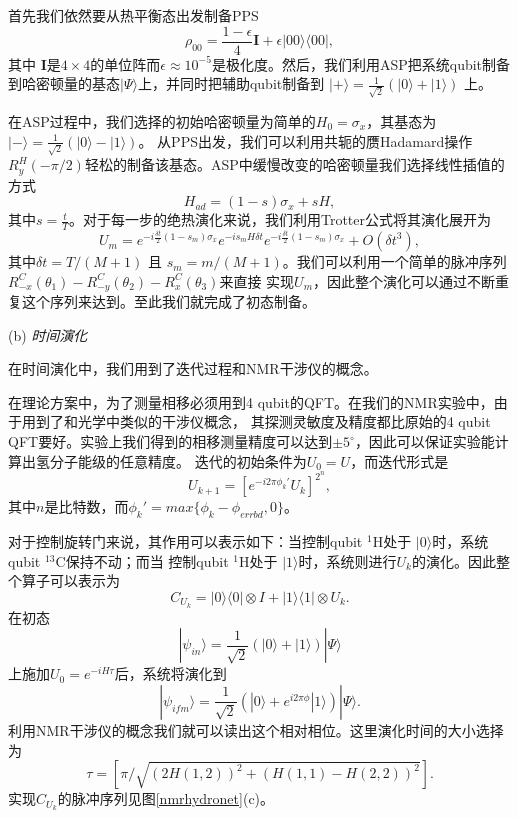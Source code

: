 首先我们依然要从热平衡态出发制备PPS
\begin{equation}
\rho_{00} =\frac{1 -
\epsilon}{4} \mathbf{I}+ \epsilon|00\rangle \langle 00|,
\end{equation}
其中 $\mathbf{I}$是$4 \times 4$的单位阵而$\epsilon \approx
10^{-5}$是极化度。然后，我们利用ASP把系统qubit制备到哈密顿量的基态$|\Psi\rangle$上，并同时把辅助qubit制备到
$|+\rangle=\frac{1}{\sqrt{2}}(|0\rangle+|1\rangle)$ 上。

在ASP过程中，我们选择的初始哈密顿量为简单的$H_0 = \sigma _x$，其基态为$|-\rangle=\frac{1}{\sqrt{2}}(|0\rangle-|1\rangle)$。
从PPS出发，我们可以利用共轭的赝Hadamard操作 $R_{y}^{H}
(-\pi/2)$轻松的制备该基态。ASP中缓慢改变的哈密顿量我们选择线性插值的方式
\begin{equation}
H_{ad}=(1-s)\sigma_x + sH,
\end{equation}
其中$s=\frac{t}{T}$。对于每一步的绝热演化来说，我们利用Trotter公式将其演化展开为
\begin{equation}
U_{m}=e^{-i\frac{\delta t}{2}(1-s_m)\sigma_{x}}e^{-is_mH\delta t}
e^{-i\frac{\delta t}{2}(1-s_m)\sigma_{x} }+O({\delta t}^{3}),
\end{equation}
其中$\delta t = T/(M+1)$ 且 $s_m=m/(M+1)$。我们可以利用一个简单的脉冲序列$R_{-x}^{C}(\theta_{1})-R_{-y}^{C}(\theta_{2})-R_{x}^{C}(\theta_{3})$来直接
实现$U_m$，因此整个演化可以通过不断重复这个序列来达到。至此我们就完成了初态制备。

(b) \emph{时间演化}

在时间演化中，我们用到了迭代过程和NMR干涉仪的概念\cite{hydro2,hydro3,hydro4}。

在理论方案中，为了测量相移必须用到4 qubit的QFT。在我们的NMR实验中，由于用到了和光学中类似的干涉仪概念，
其探测灵敏度及精度都比原始的4 qubit QFT要好。实验上我们得到的相移测量精度可以达到$\pm 5^{\circ}$，因此可以保证实验能计算出氢分子能级的任意精度。
迭代的初始条件为$U_0=U$，而迭代形式是
\begin{equation}
U_{k+1}=[e^{-i2\pi\phi_k'}U_k]^{2^n},
\end{equation}
其中$n$是比特数，而$\phi_k'=max\{\phi_k-\phi_{errbd}, 0\}$。


对于控制旋转门来说，其作用可以表示如下：当控制qubit $^1$H处于 $|0\rangle$时，系统qubit $^{13}$C保持不动；而当
控制qubit $^1$H处于 $|1\rangle$时，系统则进行$U_k$的演化。因此整个算子可以表示为
\begin{equation}
C_{U_k}=|0\rangle\langle 0|\otimes I +|1\rangle\langle 1|\otimes U_k.
\end{equation}
在初态
\begin{equation}
|\psi_{in}\rangle=\frac{1}{\sqrt{2}}(|0\rangle+|1\rangle)|\Psi\rangle
\end{equation}
上施加$U_0=e^{-iH\tau}$后，系统将演化到
\begin{equation}
|\psi_{ifm}\rangle=\frac{1}{\sqrt{2}}(|0\rangle+e^{i2\pi\phi}|1\rangle)|\Psi\rangle.
\end{equation}
利用NMR干涉仪的概念我们就可以读出这个相对相位。这里演化时间的大小选择为
\begin{equation}
\tau = [\pi/\sqrt{(2H(1,2))^2+(H(1,1)-H(2,2))^2}].
\end{equation}
实现$C_{U_k}$的脉冲序列见图\ref{nmrhydronet}(c)。

